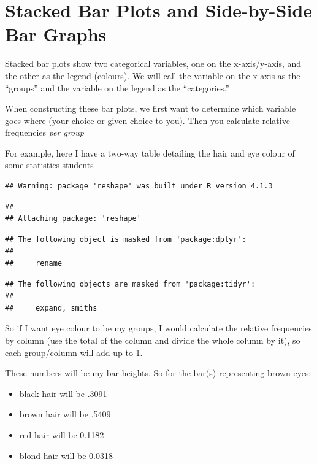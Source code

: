 \documentclass[
]{book}
\theoremstyle{definition}
\theoremstyle{definition}
\theoremstyle{definition}
\theoremstyle{definition}
\theoremstyle{remark}
\begin{document}
\hypertarget{stacked-bar-plots-and-side-by-side-bar-graphs}{%
\section{Stacked Bar Plots and Side-by-Side Bar Graphs}\label{stacked-bar-plots-and-side-by-side-bar-graphs}}

Stacked bar plots show two categorical variables, one on the
x-axis/y-axis, and the other as the legend (colours). We will call the
variable on the x-axis as the ``groups'' and the variable on the legend as
the ``categories.''

When constructing these bar plots, we first want to determine which
variable goes where (your choice or given choice to you). Then you
calculate relative frequencies \emph{per group}

For example, here I have a two-way table detailing the hair and eye
colour of some statistics students

\begin{verbatim}
## Warning: package 'reshape' was built under R version 4.1.3
\end{verbatim}

\begin{verbatim}
## 
## Attaching package: 'reshape'
\end{verbatim}

\begin{verbatim}
## The following object is masked from 'package:dplyr':
## 
##     rename
\end{verbatim}

\begin{verbatim}
## The following objects are masked from 'package:tidyr':
## 
##     expand, smiths
\end{verbatim}

So if I want eye colour to be my groups, I would calculate the relative
frequencies by column (use the total of the column and divide the whole
column by it), so each group/column will add up to 1.

These numbers will be my bar heights. So for the bar(s) representing
brown eyes:

\begin{itemize}
\item
  black hair will be .3091
\item
  brown hair will be .5409
\item
  red hair will be 0.1182
\item
  blond hair will be 0.0318
\end{itemize}
\end{document}
